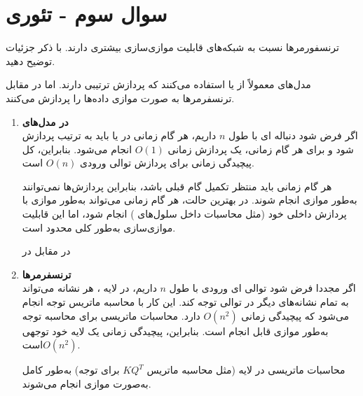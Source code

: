 \section{سوال سوم - تئوری}

ترنسفورمرها نسبت به شبکه‌های  قابلیت موازی‌سازی بیشتری دارند. با ذکر جزئیات توضیح دهید.


\begin{qsolve}
مدل‌های  معمولاً از  یا  استفاده می‌کنند که پردازش ترتیبی دارند. اما در مقابل ترنسفرمرها به صورت موازی داده‌ها را پردازش می‌کنند.

\begin{enumerate}
	\item \textbf{در مدل‌های }\\
	اگر فرض شود دنباله ای با طول $n$ داریم، هر گام زمانی در  یا  باید به ترتیب پردازش شود و برای هر گام زمانی، یک پردازش زمانی $O(1)$ انجام می‌شود. بنابراین، کل پیچیدگی زمانی برای پردازش توالی ورودی $O(n)$ است. 
	
هر گام زمانی باید منتظر تکمیل گام قبلی باشد، بنابراین پردازش‌ها نمی‌توانند به‌طور موازی انجام شوند. در بهترین حالت، هر گام زمانی می‌تواند به‌طور موازی با پردازش داخلی خود (مثل محاسبات داخل سلول‌های ) انجام شود، اما این قابلیت موازی‌سازی به‌طور کلی محدود است.

در مقابل در \item \textbf{ترنسفرمرها}\\
اگر مجددا فرض شود توالی ای ورودی با طول $n$ داریم، در لایه ، هر نشانه می‌تواند به تمام نشانه‌های دیگر در توالی توجه کند. این کار با محاسبه ماتریس توجه انجام می‌شود که پیچیدگی زمانی $O(n^2)$ دارد.
محاسبات ماتریسی برای محاسبه توجه به‌طور موازی قابل انجام است. بنابراین، پیچیدگی زمانی یک لایه خود توجهی $O(n^2)$است.

محاسبات ماتریسی در لایه  (مثل محاسبه ماتریس $KQ^T$ برای توجه) به‌طور کامل به‌صورت موازی انجام می‌شوند.
\end{enumerate}
	
\end{qsolve}